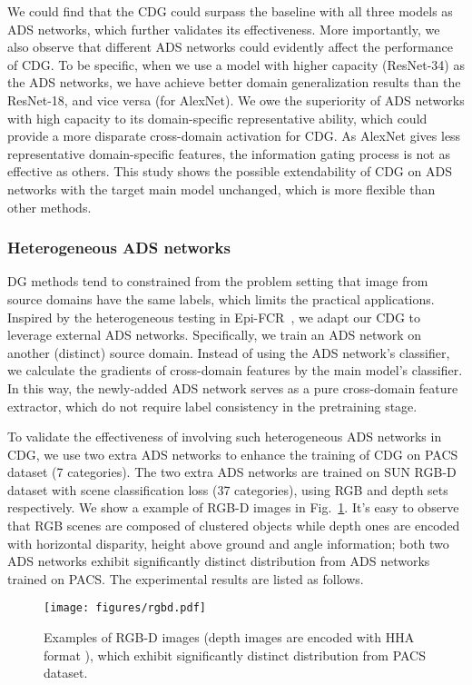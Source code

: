 We could find that the CDG could surpass the baseline with all three models as ADS networks, which further validates its effectiveness. More importantly, we also observe that different ADS networks could evidently affect the performance of CDG. To be specific, when we use a model with higher capacity (ResNet-34) as the ADS networks, we have achieve better domain generalization results than the ResNet-18, and vice versa (for AlexNet). We owe the superiority of ADS networks with high capacity to its domain-specific representative ability, which could provide a more disparate cross-domain activation for CDG. As AlexNet gives less representative  domain-specific features, the information gating process is not as effective as others. This study shows the possible extendability of CDG on ADS networks with the target main model unchanged, which is more flexible than other methods. 

\subsubsection{Heterogeneous ADS networks}

DG methods tend to constrained from the problem setting that image from source domains have the same labels, which limits the practical applications. Inspired by the heterogeneous testing in Epi-FCR~\citep{li2019episodic}, we adapt our CDG to leverage external ADS networks. Specifically, we train an ADS network on another (distinct) source domain. Instead of using the ADS network's classifier, we calculate the gradients of cross-domain features by the main model's classifier. In this way, the newly-added ADS network serves as a pure cross-domain feature extractor, which do not require label consistency in the pretraining stage. 

To validate the effectiveness of involving such heterogeneous ADS networks in CDG, we use two extra ADS networks to enhance the training of CDG on PACS dataset (7 categories). The two extra ADS networks are trained on SUN RGB-D dataset with scene classification loss (37 categories), using RGB and depth sets respectively. We show a example of RGB-D images in Fig.~\ref{fig:rgbd}. It's easy to observe that RGB scenes are composed of clustered objects while depth ones are encoded with horizontal disparity, height above ground and angle information; both two ADS networks exhibit significantly distinct distribution from ADS networks trained on PACS. The experimental results are listed as follows.

\begin{figure}[tb]
  \centering
  \texttt{[image: figures/rgbd.pdf]}
  \caption{Examples of RGB-D images (depth images are encoded with HHA format \citep{gupta2014learning}), which exhibit significantly distinct distribution from PACS dataset. }
  \label{fig:rgbd}
\end{figure}

